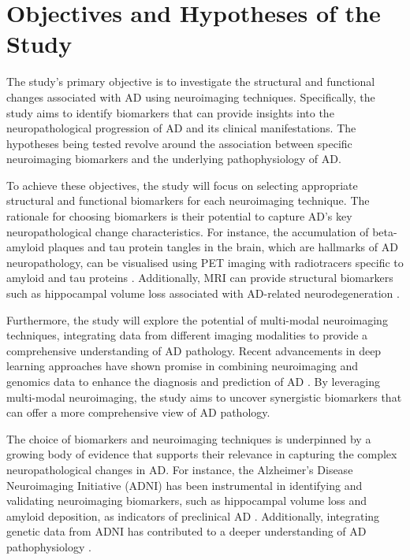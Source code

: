 \documentclass[10pt]{article}
\begin{document}
\begin{sloppypar}
  \section{Objectives and Hypotheses of the Study}
  \label{sec:objectives-and-hypotheses}

  The study's primary objective is to investigate the structural and functional changes associated with AD using neuroimaging techniques. Specifically, the study aims to identify biomarkers that can provide insights into the neuropathological progression of AD and its clinical manifestations. The hypotheses being tested revolve around the association between specific neuroimaging biomarkers and the underlying pathophysiology of AD.

  To achieve these objectives, the study will focus on selecting appropriate structural and functional biomarkers for each neuroimaging technique. The rationale for choosing biomarkers is their potential to capture AD's key neuropathological change characteristics. For instance, the accumulation of beta-amyloid plaques and tau protein tangles in the brain, which are hallmarks of AD neuropathology, can be visualised using PET imaging with radiotracers specific to amyloid and tau proteins \citep{bao_pet_2021}. Additionally, MRI can provide structural biomarkers such as hippocampal volume loss associated with AD-related neurodegeneration \citep{besson_cognitive_2015}.

  Furthermore, the study will explore the potential of multi-modal neuroimaging techniques, integrating data from different imaging modalities to provide a comprehensive understanding of AD pathology. Recent advancements in deep learning approaches have shown promise in combining neuroimaging and genomics data to enhance the diagnosis and prediction of AD \citep{lin_deep_2021}. By leveraging multi-modal neuroimaging, the study aims to uncover synergistic biomarkers that can offer a more comprehensive view of AD pathology.

  The choice of biomarkers and neuroimaging techniques is underpinned by a growing body of evidence that supports their relevance in capturing the complex neuropathological changes in AD. For instance, the Alzheimer's Disease Neuroimaging Initiative (ADNI) has been instrumental in identifying and validating neuroimaging biomarkers, such as hippocampal volume loss and amyloid deposition, as indicators of preclinical AD \citep{saykin_genetic_2015}. Additionally, integrating genetic data from ADNI has contributed to a deeper understanding of AD pathophysiology \citep{saykin_genetic_2015}.


\end{sloppypar}
\end{document}
